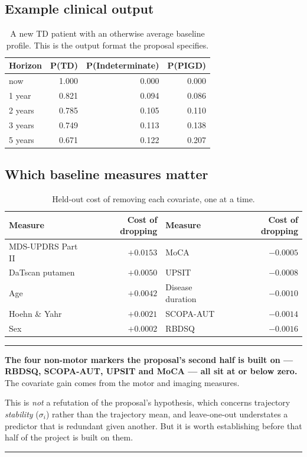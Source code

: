 \documentclass[11pt,a4paper]{article}
\newenvironment{keypoint}
  {\begin{center}\begin{minipage}{0.94\textwidth}%
   \vspace{4pt}\hrule\vspace{7pt}\small}
  {\vspace{7pt}\hrule\vspace{4pt}\end{minipage}\end{center}}
\begin{document}
\subsection{Example clinical output}

\begin{table}[H]
\centering
\begin{tabular}{@{}lrrr@{}}
\toprule
\textbf{Horizon} & \textbf{P(TD)} & \textbf{P(Indeterminate)} & \textbf{P(PIGD)} \\
\midrule
now      & 1.000 & 0.000 & 0.000 \\
1 year   & 0.821 & 0.094 & 0.086 \\
2 years  & 0.785 & 0.105 & 0.110 \\
3 years  & 0.749 & 0.113 & 0.138 \\
5 years  & 0.671 & 0.122 & 0.207 \\
\bottomrule
\end{tabular}
\caption{A new TD patient with an otherwise average baseline profile. This is
the output format the proposal specifies.}
\label{tab:clinical-new}
\end{table}

\subsection{Which baseline measures matter}

\begin{table}[H]
\centering
\small
\begin{tabular}{@{}lr|lr@{}}
\toprule
\textbf{Measure} & \textbf{Cost of dropping} & \textbf{Measure} & \textbf{Cost of dropping} \\
\midrule
MDS-UPDRS Part II   & $+0.0153$ & MoCA          & $-0.0005$ \\
DaTscan putamen     & $+0.0050$ & UPSIT         & $-0.0008$ \\
Age                 & $+0.0042$ & Disease duration & $-0.0010$ \\
Hoehn \& Yahr       & $+0.0021$ & SCOPA-AUT     & $-0.0014$ \\
Sex                 & $+0.0002$ & RBDSQ         & $-0.0016$ \\
\bottomrule
\end{tabular}
\caption{Held-out cost of removing each covariate, one at a time.}
\end{table}

\begin{keypoint}
\textbf{The four non-motor markers the proposal's second half is built on ---
RBDSQ, SCOPA-AUT, UPSIT and MoCA --- all sit at or below zero.} The covariate
gain comes from the motor and imaging measures.

This is \emph{not} a refutation of the proposal's hypothesis, which concerns
trajectory \emph{stability} ($\sigma_i$) rather than the trajectory mean, and
leave-one-out understates a predictor that is redundant given another. But it is
worth establishing before that half of the project is built on them.
\end{keypoint}
\end{document}
